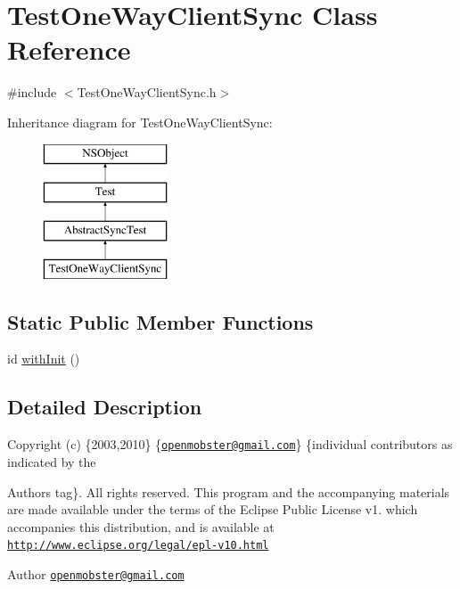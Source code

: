\hypertarget{interface_test_one_way_client_sync}{
\section{\-Test\-One\-Way\-Client\-Sync \-Class \-Reference}
\label{interface_test_one_way_client_sync}
}


{\ttfamily \#include $<$\-Test\-One\-Way\-Client\-Sync.\-h$>$}

\-Inheritance diagram for \-Test\-One\-Way\-Client\-Sync\-:\begin{figure}[H]
\begin{center}
\leavevmode
\includegraphics[height=4.000000cm]{interface_test_one_way_client_sync}
\end{center}
\end{figure}
\subsection*{\-Static \-Public \-Member \-Functions}
\begin{DoxyCompactItemize}
\item 
id \hyperlink{interface_test_one_way_client_sync_a79669fcd444a59a3196c8ad5b2cb43a4}{with\-Init} ()
\end{DoxyCompactItemize}


\subsection{\-Detailed \-Description}
\-Copyright (c) \{2003,2010\} \{\href{mailto:openmobster@gmail.com}{\tt openmobster@gmail.\-com}\} \{individual contributors as indicated by the \begin{DoxyAuthor}{\-Authors}
tag\}. \-All rights reserved. \-This program and the accompanying materials are made available under the terms of the \-Eclipse \-Public \-License v1. which accompanies this distribution, and is available at \href{http://www.eclipse.org/legal/epl-v10.html}{\tt http\-://www.\-eclipse.\-org/legal/epl-\/v10.\-html}
\end{DoxyAuthor}
\begin{DoxyAuthor}{\-Author}
\href{mailto:openmobster@gmail.com}{\tt openmobster@gmail.\-com} 
\end{DoxyAuthor}



